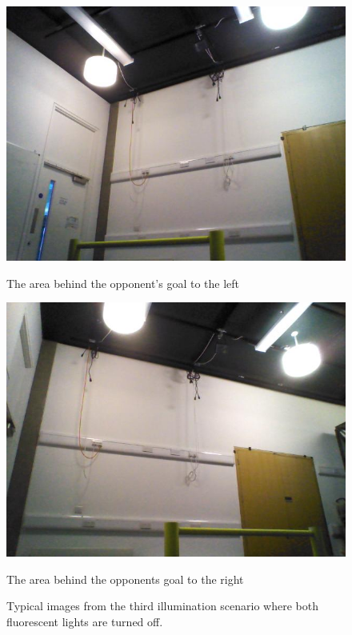 \begin{figure}
\begin{minipage}[b]{0.5\linewidth}
\includegraphics[scale=0.3]{../Drawings/lighting/bothLights/3.jpg}
\caption{The area behind the opponent's goal to the left}
\label{fig:bothogleft}
\end{minipage}
\hspace{0.5cm}
\begin{minipage}[b]{0.5\linewidth}
\includegraphics[scale=0.3]{../Drawings/lighting/bothLights/4.jpg}
\caption{The area behind the opponents goal to the right}
\label{fig:bothogright}
\end{minipage}
\caption{Typical images from the third illumination scenario where both fluorescent lights are turned off.}
\end{figure}


